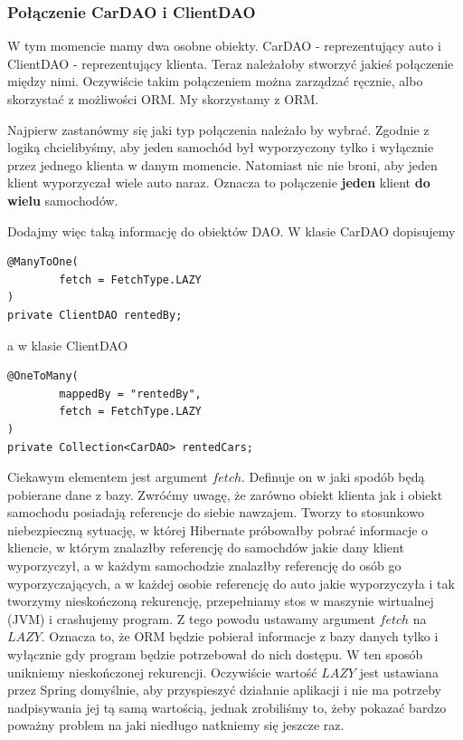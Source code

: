\documentclass{article}
\begin{document}
        \subsubsection{Połączenie CarDAO i ClientDAO}
            W tym momencie mamy dwa osobne obiekty. CarDAO - reprezentujący auto i ClientDAO - reprezentujący klienta. Teraz należałoby stworzyć jakieś połączenie między nimi. Oczywiście takim połączeniem można zarządzać ręcznie, albo skorzystać z możliwości ORM. My skorzystamy z ORM. 
            
            Najpierw zastanówmy się jaki typ połączenia należało by wybrać. Zgodnie z logiką chcielibyśmy, aby jeden samochód był wyporzyczony tylko i wyłącznie przez jednego klienta w danym momencie. Natomiast nic nie broni, aby jeden klient wyporzyczał wiele auto naraz. Oznacza to połączenie \textbf{jeden} klient \textbf{do wielu} samochodów. 
            
            Dodajmy więc taką informację do obiektów DAO. W klasie CarDAO dopisujemy
            \begin{verbatim}
@ManyToOne(
        fetch = FetchType.LAZY
)
private ClientDAO rentedBy;
            \end{verbatim}
            a w klasie ClientDAO
            \begin{verbatim}
@OneToMany(
        mappedBy = "rentedBy",
        fetch = FetchType.LAZY
)
private Collection<CarDAO> rentedCars;
            \end{verbatim}
            Ciekawym elementem jest argument $fetch$. Definuje on  w jaki spodób będą pobierane dane z bazy. Zwróćmy uwagę, że zarówno obiekt klienta jak i obiekt samochodu posiadają referencje do siebie nawzajem. Tworzy to stosunkowo niebezpieczną sytuację, w której Hibernate próbowałby pobrać informacje o kliencie, w którym znalazłby referencję do samochdów jakie dany klient wyporzyczył, a w każdym samochodzie znalazłby referencję do osób go wyporzyczających, a w każdej osobie referencję do auto jakie wyporzyczyła i tak tworzymy nieskończoną rekurencję, przepełniamy stos w maszynie wirtualnej (JVM) i crashujemy program. Z tego powodu ustawamy argument $fetch$ na $LAZY$. Oznacza to, że ORM będzie pobierał informacje z bazy danych tylko i wyłącznie gdy program będzie potrzebował do nich dostępu. W ten sposób unikniemy nieskończonej rekurencji. Oczywiście wartość $LAZY$ jest ustawiana przez Spring domyślnie, aby przyspieszyć działanie aplikacji i nie ma potrzeby nadpisywania jej tą samą wartością, jednak zrobiliśmy to, żeby pokazać bardzo poważny problem na jaki niedługo natkniemy się jeszcze raz.
\end{document}
